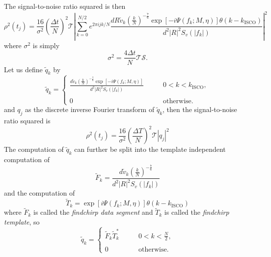The signal-to-noise ratio squared is then
\begin{equation}
\rho^2(t_j) = 
\frac{16}{\sigma^2}\left(\frac{\Delta t}{N}\right)^2 \mathcal{T}
\left| 
  \sum_{k=0}^{N/2} e^{2\pi ijk/N} 
  \frac{dR\tilde{v}_k \left(\frac{k}{N}\right)^{-\frac{7}{6}} \exp\left[-i\Psi(f_k;M,\eta)\right] \theta\left(k-k_\mathrm{ISCO}\right)}
       {d^2|R|^2 S_v\left(\left|f_k\right|\right)}
\right|^2 
\label{eq:signaltonoisesq}
\end{equation}
where $\sigma^2$ is simply
\begin{equation}
\sigma^2 = \frac{4\Delta t}{N} \mathcal{T}\mathcal{S}.
\label{eq:sigmasqts}
\end{equation}
Let us define $\tilde{q}_k$ by
\begin{equation}
\label{eq:qtildedef}
\tilde{q}_k = \left\{
\begin{array}{ll}
\frac{d\tilde{v}_k \left(\frac{k}{N}\right)^{-\frac{7}{6}} \exp\left[-i\Psi(f_k;M,\eta)\right]}
     {d^2|R|^2S_v\left(\left|f_k\right|\right)} 
  \quad\quad & 0 < k < k_\mathrm{ISCO},\\
\\
0 & \mathrm{otherwise}.
\end{array}
\right.
\end{equation}
and $q_j$ as the discrete inverse Fourier transform of $\tilde{q}_k$, then
the signal-to-noise ratio squared is
\begin{equation}
\rho^2(t_j) = \frac{16}{\sigma^2}\left(\frac{\Delta T}{N}\right)^2 \mathcal{T}
\left|q_j\right|^2
\end{equation}
The computation of $\tilde{q}_k$ can further be split into the template
independent computation of
\begin{equation}
\tilde{F}_k = \frac{d\tilde{v}_k \left(\frac{k}{N}\right)^{-\frac{7}{6}}}
{d^2|R|^2S_v\left(\left|f_k\right|\right)}
\end{equation}
and the computation of
\begin{equation}
\tilde{T}_k = \exp\left[i\Psi(f_k;M,\eta)\right] \theta\left(k-k_\mathrm{ISCO}\right)
\end{equation}
where $\tilde{F}_k$ is called the \emph{findchirp data segment} and 
$\tilde{T}_k$ is called the \emph{findchirp template}, so
\begin{equation}
\tilde{q}_k = \left\{
\begin{array}{ll}
\tilde{F}_k \tilde{T}_k^\ast \quad\quad & 0 < k < \frac{N}{2},\\
\\
0 & \mathrm{otherwise}.
\end{array}
\right.
\end{equation}

